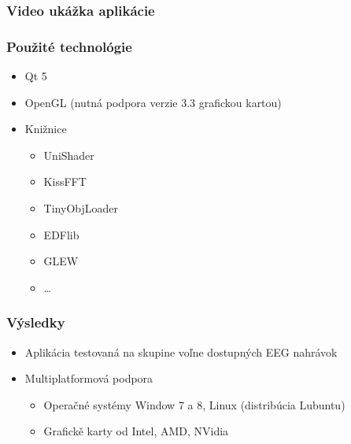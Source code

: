 \documentclass{beamer}
\begin{document}
\begin{frame}
	\frametitle{Video ukážka aplikácie}
	\begin{center}
	\end{center}
\end{frame}

\begin{frame}
	\frametitle{Použité technológie}
	\begin{itemize}
		\item Qt 5
		\item OpenGL (nutná podpora verzie 3.3 grafickou kartou)
		\item Knižnice
		\begin{itemize}
			\item UniShader
			\item KissFFT
			\item TinyObjLoader
			\item EDFlib
			\item GLEW
			\item \ldots
		\end{itemize}
	\end{itemize}
\end{frame}

\begin{frame}
	\frametitle{Výsledky}
	\begin{itemize}
		\item Aplikácia testovaná na skupine voľne dostupných EEG nahrávok
		\item Multiplatformová podpora
		\begin{itemize}
			\item Operačné systémy Window 7 a 8, Linux (distribúcia Lubuntu)
			\item Grafickě karty od Intel, AMD, NVidia
		\end{itemize}
	\end{itemize}
\end{frame}
\end{document}
